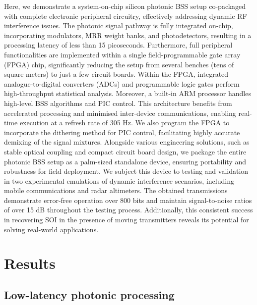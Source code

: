 \documentclass[pdflatex,mathphys]{sty}%
\begin{document}
Here, we demonstrate a system-on-chip silicon photonic BSS setup co-packaged with complete electronic peripheral circuitry, effectively addressing dynamic RF interference issues. The photonic signal pathway is fully integrated on-chip, incorporating modulators, MRR weight banks, and photodetectors, resulting in a processing latency of less than 15 picoseconds. Furthermore, full peripheral functionalities are implemented within a single field-programmable gate array (FPGA) chip, significantly reducing the setup from several benches (tens of square meters) to just a few circuit boards. Within the FPGA, integrated analogue-to-digital converters (ADCs) and programmable logic gates perform high-throughput statistical analysis. Moreover, a built-in ARM processor handles high-level BSS algorithms and PIC control. This architecture benefits from accelerated processing and minimised inter-device communications, enabling real-time execution at a refresh rate of 305 Hz. We also program the FPGA to incorporate the dithering method for PIC control, facilitating highly accurate demixing of the signal mixtures. Alongside various engineering solutions, such as stable optical coupling and compact circuit board design, we package the entire photonic BSS setup as a palm-sized standalone device, ensuring portability and robustness for field deployment. We subject this device to testing and validation in two experimental emulations of dynamic interference scenarios, including mobile communications and radar altimeters. The obtained transmissions demonstrate error-free operation over 800 bits and maintain signal-to-noise ratios of over 15 dB throughout the testing process. Additionally, this consistent success in recovering SOI in the presence of moving transmitters reveals its potential for solving real-world applications.

\section{Results}
\subsection{Low-latency photonic processing}
\end{document}
